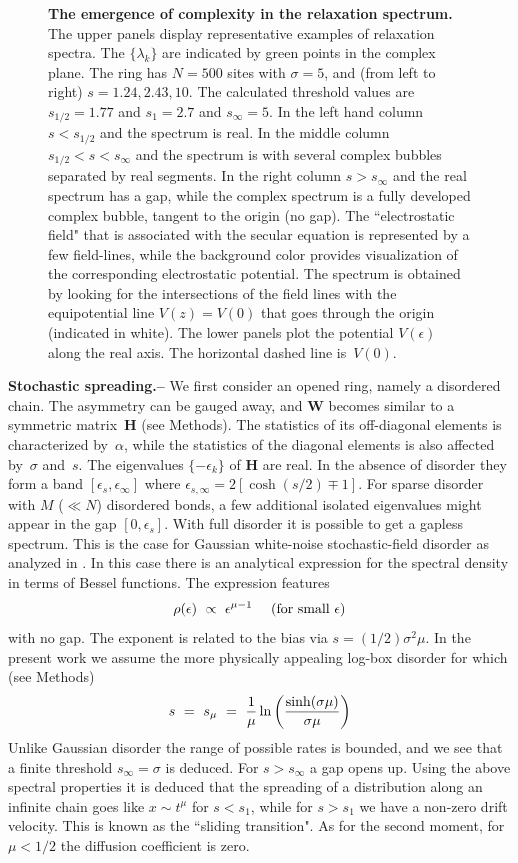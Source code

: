 \documentclass[aps,pre,floats,floatfix,twocolumn]{revtex4}
\newcommand{\be}[1]{\begin{eqnarray}\ifthenelse{#1=-1}{\nonumber}{\ifthenelse{#1=0}{}{\label{e#1}}}}
\newcommand{\eeq}{\end{eqnarray}}
\newcommand{\Ap}[1]{\textcolor{blue}{{appendix}\!~(\ref{#1})}}
\newcommand{\sect}[1]{{\bf #1.-- }}
\begin{document}
\begin{figure}
\caption{\label{froots} 
{\bf The emergence of complexity in the relaxation spectrum.} 
The upper panels display representative examples of relaxation spectra.
The $\{\lambda_k\}$ are indicated by green points in the complex plane. 
The ring has $N{=}500$ sites with $\sigma{=}5$, 
and (from left to right) ${s=1.24, 2.43, 10}$. 
The calculated threshold values are ${s_{1/2}=1.77}$ and ${s_1=2.7}$ and ${s_{\infty}=5}$.
In the left hand column ${s<s_{1/2}}$ and the spectrum is real.
In the middle column ${s_{1/2} < s < s_{\infty}}$ and the spectrum is  
with several complex bubbles separated by real segments. 
In the right column  ${s>s_{\infty}}$ and the real spectrum has a gap, 
while the complex spectrum is a fully developed complex bubble, 
tangent to the origin (no gap). 
%
The ``electrostatic field" that is associated with the secular equation 
is represented by a few field-lines, while the background color provides 
visualization of the corresponding electrostatic potential. 
The spectrum is obtained by looking  for the intersections 
of the field lines with the equipotential line ${V(z)=V(0)}$ 
that goes through the origin (indicated in white). 
%
The lower panels plot the potential $V(\epsilon)$ along the real axis. 
The horizontal dashed line is~$V(0)$. 
}
\end{figure}




\sect{Stochastic spreading}
%
We first consider an opened ring, namely a disordered chain. 
The asymmetry can be gauged away, and $\bm{W}$ becomes similar 
to a symmetric matrix~$\bm{H}$ (see Methods). 
The statistics of its off-diagonal elements 
is characterized by~$\alpha$, 
while the statistics of the diagonal elements 
is also affected by~$\sigma$ and~$s$.   
The eigenvalues $\{-\epsilon_k\}$ of $\bm{H}$ are real.
In the absence of disorder they form a band ${[\epsilon_s,\epsilon_{\infty}]}$
where ${\epsilon_{s,\infty}=2[\cosh(s/2)\mp1]}$. 
%
For sparse disorder with $M$ ($\ll N$) disordered bonds, 
a few additional isolated eigenvalues might appear 
in the gap ${[0,\epsilon_s]}$.
%
With full disorder it is possible to get a gapless spectrum. 
This is the case for Gaussian white-noise stochastic-field disorder 
as analyzed in \cite{odh3}. %
In this case there is an analytical expression 
for the spectral density in terms of Bessel functions.
The expression features 
%
\be{3}
\rho(\epsilon) \ \propto \ \epsilon^{\mu-1} \ \ \ \ \text{(for small $\epsilon$)}
\eeq
%
with no gap. 
The exponent is related to the bias via ${s=(1/2) \sigma^2 \mu}$. 
%
In the present work we assume the more physically appealing log-box 
disorder for which (see Methods)
%
\be{5}
s \ = \ s_{\mu} \ = \ \frac{1}{\mu} \ln\left( \frac{\sinh (\sigma\mu)}{\sigma\mu} \right)
\eeq
%
Unlike Gaussian disorder the range of possible rates is bounded,  
and we see that a finite threshold ${s_{\infty}=\sigma}$ is deduced.
For ${s>s_{\infty}}$ a gap opens up. 
%
Using the above spectral properties it is deduced that the  
spreading of a distribution along an infinite chain 
goes like $x\sim t^{\mu}$ for ${s<s_1}$, 
while for $s>s_1$ we have a non-zero drift velocity.
This is known as the ``sliding transition".
As for the second moment, for ${\mu<1/2}$ 
the diffusion coefficient is zero. 
\end{document}
